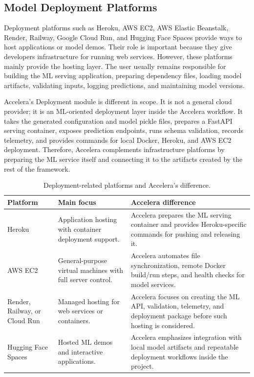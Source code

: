 \documentclass[12pt,a4paper]{report}
\newcommand{\acceleraTableStyle}{%
\small
\renewcommand{\arraystretch}{1.15}
\setlength{\tabcolsep}{4pt}%
}
\begin{document}
\subsection{Model Deployment Platforms}
Deployment platforms such as Heroku, AWS EC2, AWS Elastic Beanstalk, Render,
Railway, Google Cloud Run, and Hugging Face Spaces provide ways to host
applications or model demos. Their role is important because they give
developers infrastructure for running web services. However, these platforms
mainly provide the hosting layer. The user usually remains responsible for
building the ML serving application, preparing dependency files, loading model
artifacts, validating inputs, logging predictions, and maintaining model
versions.

Accelera's Deployment module is different in scope. It is not a general cloud
provider; it is an ML-oriented deployment layer inside the Accelera workflow.
It takes the generated configuration and model pickle files, prepares a FastAPI
serving container, exposes prediction endpoints, runs schema validation,
records telemetry, and provides commands for local Docker, Heroku, and AWS EC2
deployment. Therefore, Accelera complements infrastructure platforms by
preparing the ML service itself and connecting it to the artifacts created by
the rest of the framework.

\begin{table}[H]
\centering
\acceleraTableStyle
\caption{Deployment-related platforms and Accelera's difference.}
\label{tab:deployment_related_platforms}
\begin{tabularx}{\textwidth}{p{}X X}
\toprule
\textbf{Platform} & \textbf{Main focus} & \textbf{Accelera difference} \\
\midrule
Heroku &
Application hosting with container deployment support. &
Accelera prepares the ML serving container and provides Heroku-specific
commands for pushing and releasing it. \\
\midrule
AWS EC2 &
General-purpose virtual machines with full server control. &
Accelera automates file synchronization, remote Docker build/run steps, and
health checks for model services. \\
\midrule
Render, Railway, or Cloud Run &
Managed hosting for web services or containers. &
Accelera focuses on creating the ML API, validation, telemetry, and deployment
package before such hosting is considered. \\
\midrule
Hugging Face Spaces &
Hosted ML demos and interactive applications. &
Accelera emphasizes integration with local model artifacts and repeatable
deployment workflows inside the project. \\
\bottomrule
\end{tabularx}
\end{table}
\end{document}
